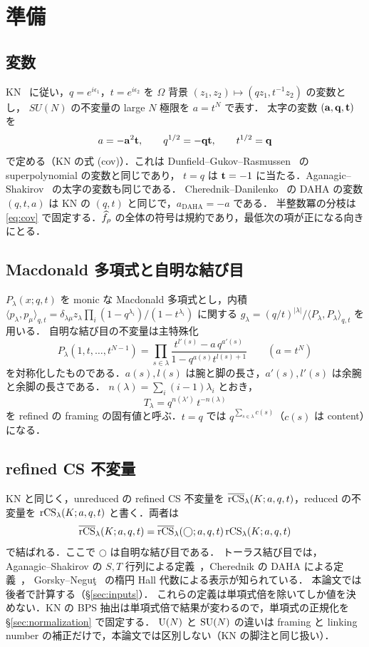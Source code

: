 \section{準備}\label{sec:prelim}

\subsection{変数}
KN~\cite{Kameyama17} に従い，$q=e^{i\epsilon_1}$，$t=e^{i\epsilon_2}$ を $\Omega$ 背景 $(z_1,z_2)\mapsto(qz_1,t^{-1}z_2)$ の変数とし，
$SU(N)$ の不変量の large $N$ 極限を $a=t^N$ で表す．
太字の変数 $(\mathbf{a},\mathbf{q},\mathbf{t})$ を
\begin{equation}\label{eq:cov}
a=-\mathbf{a}^2\mathbf{t},\qquad q^{1/2}=-\mathbf{q}\mathbf{t},\qquad t^{1/2}=\mathbf{q}
\end{equation}
で定める（KN の式 (cov)）．これは Dunfield--Gukov--Rasmussen~\cite{Dunfield05} の superpolynomial の変数と同じであり，
$t=q$ は $\mathbf{t}=-1$ に当たる．Aganagic--Shakirov~\cite{Aganagic11} の太字の変数も同じである．
Cherednik--Danilenko~\cite{Cherednik14} の DAHA の変数 $(q,t,a)$ は KN の $(q,t)$ と同じで，$a_{\mathrm{DAHA}}=-a$ である．
半整数冪の分枝は \eqref{eq:cov} で固定する．$\widehat{f}_\rho$ の全体の符号は規約であり，最低次の項が正になる向きにとる．

\subsection{Macdonald 多項式と自明な結び目}
$P_\lambda(x;q,t)$ を monic な Macdonald 多項式とし，内積 $\langle p_\lambda,p_\mu\rangle_{q,t}=\delta_{\lambda\mu}z_\lambda\prod_i(1-q^{\lambda_i})/(1-t^{\lambda_i})$ に関する
$g_\lambda=(q/t)^{|\lambda|}/\langle P_\lambda,P_\lambda\rangle_{q,t}$ を用いる．
自明な結び目の不変量は主特殊化
\[
P_\lambda(1,t,\dots,t^{N-1})=\prod_{s\in\lambda}\frac{t^{l'(s)}-a\,q^{a'(s)}}{1-q^{a(s)}t^{l(s)+1}}\qquad(a=t^N)
\]
を対称化したものである．$a(s),l(s)$ は腕と脚の長さ，$a'(s),l'(s)$ は余腕と余脚の長さである．
$n(\lambda)=\sum_i(i-1)\lambda_i$ とおき，
\[
T_\lambda=q^{n(\lambda')}\,t^{-n(\lambda)}
\]
を refined の framing の固有値と呼ぶ．$t=q$ では $q^{\sum_{s\in\lambda}c(s)}$（$c(s)$ は content）になる．

\subsection{refined CS 不変量}
KN と同じく，unreduced の refined CS 不変量を $\overline{\textrm{rCS}}_\lambda(K;a,q,t)$，reduced の不変量を $\textrm{rCS}_\lambda(K;a,q,t)$ と書く．両者は
\[
\overline{\textrm{rCS}}_\lambda(K;a,q,t)=\overline{\textrm{rCS}}_\lambda(\bigcirc;a,q,t)\,\textrm{rCS}_\lambda(K;a,q,t)
\]
で結ばれる．ここで $\bigcirc$ は自明な結び目である．
トーラス結び目では，Aganagic--Shakirov の $S,T$ 行列による定義~\cite{Aganagic11}，Cherednik の DAHA による定義~\cite{Cherednik11}，
Gorsky--Neguţ~\cite{Gorsky13b} の楕円 Hall 代数による表示が知られている．
本論文では後者で計算する（\S\ref{sec:inputs}）．
これらの定義は単項式倍を除いてしか値を決めない．KN の BPS 抽出は単項式倍で結果が変わるので，単項式の正規化を \S\ref{sec:normalization} で固定する．
$\mathrm{U}(N)$ と $\mathrm{SU}(N)$ の違いは framing と linking number の補正だけで，本論文では区別しない（KN の脚注と同じ扱い）．

